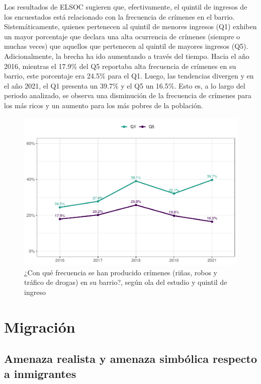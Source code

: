 \documentclass[
  12pt,
]{book}
\begin{document}
Los resultados de ELSOC sugieren que, efectivamente, el quintil de ingresos de los encuestados está relacionado con la frecuencia de crímenes en el barrio. Sistemáticamente, quienes pertenecen al quintil de menores ingresos (Q1) exhiben un mayor porcentaje que declara una alta ocurrencia de crímenes (siempre o muchas veces) que aquellos que pertenecen al quintil de mayores ingresos (Q5). Adicionalmente, la brecha ha ido aumentando a través del tiempo. Hacia el año 2016, mientras el 17.9\% del Q5 reportaba alta frecuencia de crímenes en su barrio, este porcentaje era 24.5\% para el Q1. Luego, las tendencias divergen y en el año 2021, el Q1 presenta un 39.7\% y el Q5 un 16.5\%. Esto es, a lo largo del periodo analizado, se observa una disminución de la frecuencia de crímenes para los más ricos y un aumento para los más pobres de la población.

\begin{figure}

{\centering \includegraphics{reporte-elsoc_files/figure-latex/crim-quintil-1} 

}

\caption{¿Con qué frecuencia se han producido crímenes (riñas, robos y tráfico de drogas) en su barrio?, según ola del estudio y quintil de ingreso}\label{fig:crim-quintil}
\end{figure}

\hypertarget{migraciuxf3n}{%
\section{Migración}\label{migraciuxf3n}}

\hypertarget{amenaza-realista-y-amenaza-simbuxf3lica-respecto-a-inmigrantes}{%
\subsection*{Amenaza realista y amenaza simbólica respecto a inmigrantes}\label{amenaza-realista-y-amenaza-simbuxf3lica-respecto-a-inmigrantes}}
\end{document}
